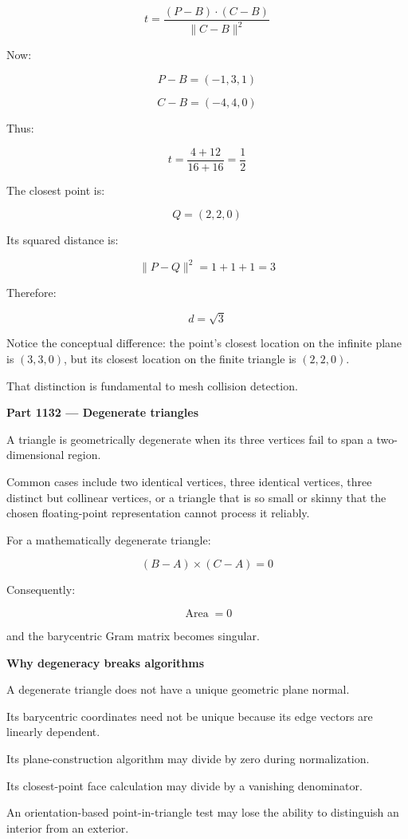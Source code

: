 \[
t=\frac{(P-B)\cdot(C-B)} {\|C-B\|^2}
\]

Now:

\[
P-B=(-1,3,1)
\]

\[
C-B=(-4,4,0)
\]

Thus:

\[
t=\frac{4+12}{16+16}=\frac12
\]

The closest point is:

\[
\boxed{Q=(2,2,0)}
\]

Its squared distance is:

\[
\|P-Q\|^2=1+1+1=3
\]

Therefore:

\[
\boxed{d=\sqrt3}
\]

Notice the conceptual difference: the point's closest location on the infinite plane is \((3,3,0)\), but its closest location on the finite triangle is \((2,2,0)\).

That distinction is fundamental to mesh collision detection.

\textbf{Part 1132 --- Degenerate triangles}

A triangle is geometrically degenerate when its three vertices fail to span a two-dimensional region.

Common cases include two identical vertices, three identical vertices, three distinct but collinear vertices, or a triangle that is so small or skinny that the chosen floating-point representation cannot process it reliably.

For a mathematically degenerate triangle:

\[
(B-A)\times(C-A)=0
\]

Consequently:

\[
\operatorname{Area}=0
\]

and the barycentric Gram matrix becomes singular.

\textbf{Why degeneracy breaks algorithms}

A degenerate triangle does not have a unique geometric plane normal.

Its barycentric coordinates need not be unique because its edge vectors are linearly dependent.

Its plane-construction algorithm may divide by zero during normalization.

Its closest-point face calculation may divide by a vanishing denominator.

An orientation-based point-in-triangle test may lose the ability to distinguish an interior from an exterior.


